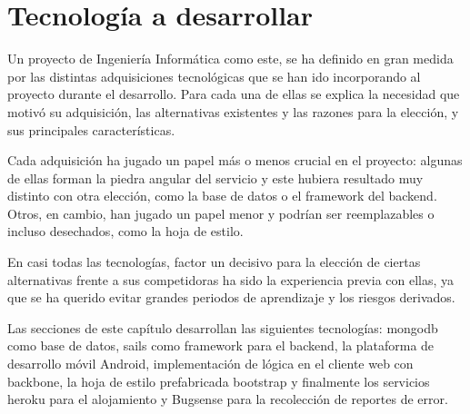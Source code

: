 \documentclass[main]{subfiles}
\begin{document}
\chapter{Tecnología a desarrollar}
\label{sec:tech}

Un proyecto de Ingeniería Informática como este, se ha definido en gran medida por las distintas adquisiciones tecnológicas que se han ido incorporando al proyecto durante el desarrollo. Para cada una de ellas se explica la necesidad que motivó su adquisición, las alternativas existentes y las razones para la elección, y sus principales características.

Cada adquisición ha jugado un papel más o menos crucial en el proyecto: algunas de ellas forman la piedra angular del servicio y este hubiera resultado muy distinto con otra elección, como la base de datos o el \gls{framework} del \gls{backend}. Otros, en cambio, han jugado un papel menor y podrían ser reemplazables o incluso desechados, como la hoja de estilo.

En casi todas las tecnologías, factor un decisivo para la elección de ciertas alternativas frente a sus competidoras ha sido la experiencia previa con ellas, ya que se ha querido evitar grandes periodos de aprendizaje y los riesgos derivados.

Las secciones de este capítulo desarrollan las siguientes tecnologías: \gls{mongodb} como base de datos, \gls{sails} como \gls{framework} para el \gls{backend}, la plataforma de desarrollo móvil Android, implementación de lógica en el cliente web con \gls{backbone}, la hoja de estilo prefabricada \gls{bootstrap} y finalmente los servicios \gls{heroku} para el alojamiento y Bugsense para la recolección de reportes de error.








\end{document}
